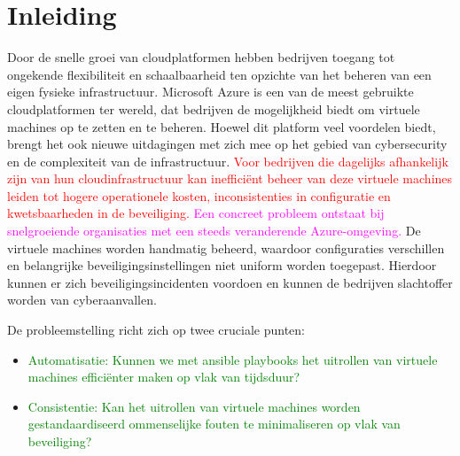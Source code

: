 


% 

\section{Inleiding}%
\label{sec:inleiding}

Door de snelle groei van cloudplatformen hebben bedrijven toegang tot ongekende flexibiliteit en schaalbaarheid ten opzichte van het beheren van een eigen fysieke infrastructuur.
Microsoft Azure is een van de meest gebruikte cloudplatformen ter wereld, dat bedrijven de mogelijkheid biedt om virtuele machines op te zetten en te beheren.
Hoewel dit platform veel voordelen biedt, brengt het ook nieuwe uitdagingen met zich mee op het gebied van cybersecurity en de complexiteit van de infrastructuur.
\textcolor{red}{Voor bedrijven die dagelijks afhankelijk zijn van hun cloudinfrastructuur kan inefficiënt beheer van deze virtuele machines leiden tot hogere operationele kosten, inconsistenties in configuratie en kwetsbaarheden in de beveiliging.}
\textcolor{magenta}{Een concreet probleem ontstaat bij snelgroeiende organisaties met een steeds veranderende Azure-omgeving.}
De virtuele machines worden handmatig beheerd, waardoor configuraties verschillen en belangrijke beveiligingsinstellingen niet uniform worden toegepast.
Hierdoor kunnen er zich beveiligingsincidenten voordoen en kunnen de bedrijven slachtoffer worden van cyberaanvallen.

De probleemstelling richt zich op twee cruciale punten:

\begin{itemize}
  \item\textcolor{green}{Automatisatie: Kunnen we met ansible playbooks het uitrollen van virtuele machines efficiënter maken op vlak van tijdsduur?}
  \item\textcolor{green}{Consistentie: Kan het uitrollen van virtuele machines worden gestandaardiseerd om\linebreak menselijke fouten te minimaliseren op vlak van beveiliging?}
\end{itemize}


